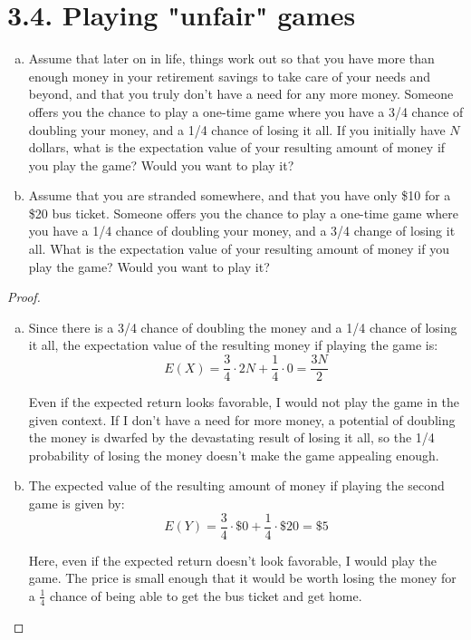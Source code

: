 \section*{3.4. Playing "unfair" games}
\begin{enumerate}[(a)]
    \item Assume that later on in life, things work out so that you have more than enough money
        in your retirement savings to take care of your needs and beyond, and that you truly
        don't have a need for any more money. Someone offers you the chance to play a one-time
        game where you have a 3/4 chance of doubling your money, and a 1/4 chance of losing 
        it all. If you initially have $N$ dollars, what is the expectation value of your
        resulting amount of money if you play the game? Would you want to play it?

    \item Assume that you are stranded somewhere, and that you have only \$10 for a \$20 bus
        ticket. Someone offers you the chance to play a one-time game where you have a 1/4
        chance of doubling your money, and a 3/4 change of losing it all. What is the expectation
        value of your resulting amount of money if you play the game? Would you want to play it?
\end{enumerate}

\vspace{1em}

\begin{proof}
    \hfill
    \begin{enumerate}[(a)]
        \item Since there is a 3/4 chance of doubling the money and a 1/4 chance of losing it all,
            the expectation value of the resulting money if playing the game is:
            \[
                E(X) = \frac{3}{4} \cdot 2N + \frac{1}{4} \cdot 0 = \frac{3N}{2}
            \] 

            Even if the expected return looks favorable, I would not play the game in the given context.
            If I don't have a need for more money, a potential of doubling the money is dwarfed by the 
            devastating result of losing it all, so the 1/4 probability of losing the money doesn't 
            make the game appealing enough.

        \item The expected value of the resulting amount of money if playing the second game is given
            by:
            \[
                E(Y) = \frac{3}{4} \cdot \$0 + \frac{1}{4} \cdot \$20 = \$5
            \] 

            Here, even if the expected return doesn't look favorable, I would play the game. The price
            is small enough that it would be worth losing the money for a $\frac{1}{4}$ chance of being 
            able to get the bus ticket and get home.
    \end{enumerate}
\end{proof}

